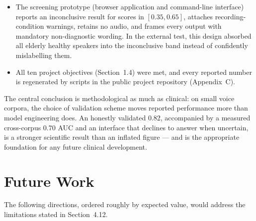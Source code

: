 \begin{itemize}
        with the model frozen and a bandwidth-harmonization step
        neutralizing a discovered sample-rate confound, yielded a
        speaker-level AUC of 0.701 and balanced accuracy of 0.629 on
        the age-fair comparison --- evidence that a genuine,
        transferable acoustic signal survives domain shift, and a
        measurement of how much is lost to it.
  \item The screening prototype (browser application and command-line
        interface) reports an inconclusive result for scores in
        $[0.35, 0.65]$, attaches recording-condition warnings, retains
        no audio, and frames every output with mandatory
        non-diagnostic wording. In the external test, this design
        absorbed all elderly healthy speakers into the inconclusive
        band instead of confidently mislabelling them.
  \item All ten project objectives (Section~1.4) were met, and every
        reported number is regenerated by scripts in the public
        project repository (Appendix~C).
\end{itemize}

The central conclusion is methodological as much as clinical: on small
voice corpora, the choice of validation scheme moves reported
performance more than model engineering does. An honestly validated
0.82, accompanied by a measured cross-corpus 0.70 AUC and an interface
that declines to answer when uncertain, is a stronger scientific
result than an inflated figure --- and is the appropriate foundation
for any future clinical development.

\section{Future Work}

The following directions, ordered roughly by expected value, would
address the limitations stated in Section~4.12.

